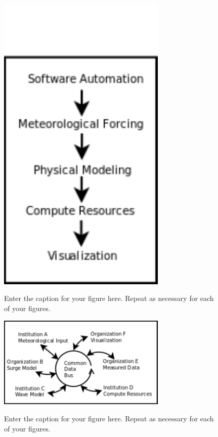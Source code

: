 \documentclass[12pt]{article}
\begin{document}

\begin{figure}[t]
  \noindent\includegraphics[width=19pc,angle=0]{closed_system.pdf}\\
  \caption{Enter the caption for your figure here.  Repeat as
  necessary for each of your figures.}\label{f1}
\end{figure}

\begin{figure}[t]
  \noindent\includegraphics[width=19pc,angle=0]{distributed_chain.pdf}\\
  \caption{Enter the caption for your figure here.  Repeat as
  necessary for each of your figures.}\label{f1}
\end{figure}
\end{document}
